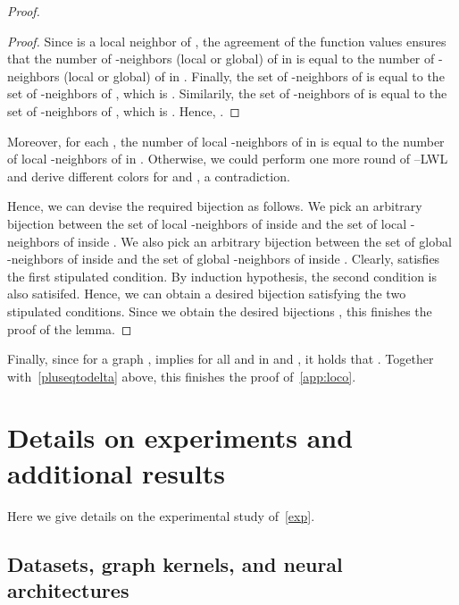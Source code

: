 \documentclass{article}
\theoremstyle{definition}
\newcommand{\pluskwl}{--\textsf{LWL}\xspace}
\begin{document}
\begin{proof}
\begin{proof}
		Since  is a local neighbor of , the agreement of the  function values ensures that the number of -neighbors (local or global) of  in  is equal to the number of -neighbors (local or global) of  in . Finally, the set of -neighbors of  is equal to the set of -neighbors of , which is . Similarily, the set of -neighbors of  is equal to the set of -neighbors of , which is . 
		Hence, . 
	\end{proof} 
	
	Moreover, for each , the number of local -neighbors of  in  is equal to the number of local -neighbors of  in . Otherwise, we could perform one more round of \pluskwl and derive different colors for  and , a contradiction. 
	
	Hence, we can devise the required bijection  as follows. We pick an arbitrary bijection  between the set of local -neighbors of  inside  and the set of local -neighbors of  inside . We also pick an arbitrary bijection  between the set of global -neighbors of  inside  and the set of global -neighbors of  inside . Clearly,  satisfies the first stipulated condition. By induction hypothesis, the second condition is also satisifed. Hence, we can obtain a desired bijection  satisfying the two stipulated conditions. Since we obtain the desired bijections , this finishes the proof of the lemma. 
\end{proof}

Finally, since for a graph ,   implies   for all  and  in  and , it holds that . Together with~\cref{pluseqtodelta} above, this finishes the proof of~\cref{app:loco}.

\section{Details on experiments and additional results}\label{app:exp}

Here we give details on the experimental study of~\cref{exp}.

\subsection{Datasets, graph kernels, and neural architectures}\label{datasets}
\end{document}
